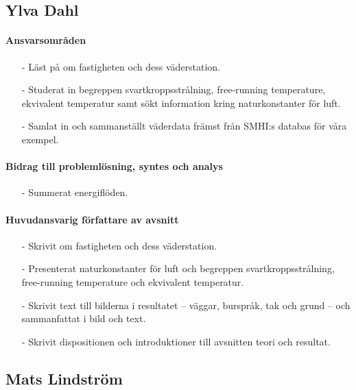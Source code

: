\documentclass[12pt,a4paper]{article}
\begin{document}
\subsection*{Ylva Dahl}

\paragraph{Ansvarsområden}

\begin{itemize}
\item[-] Läst på om fastigheten och dess väderstation.
\item[-] Studerat in begreppen svartkroppsstrålning, free-running temperature, ekvivalent temperatur samt sökt information kring naturkonstanter för luft.
\item[-] Samlat in och sammanställt väderdata främst från SMHI:s databas för våra exempel.
\end{itemize}

\paragraph{Bidrag till problemlösning, syntes och analys}
\begin{itemize}
\item[-] Summerat energiflöden.
\end{itemize}

\paragraph{Huvudansvarig författare av avsnitt}

\begin{itemize}
\item[-] Skrivit om fastigheten och dess väderstation.
\item[-] Presenterat naturkonstanter för luft och begreppen svartkroppsstrålning, free-running temperature och ekvivalent temperatur.
\item[-] Skrivit text till bilderna i resultatet – väggar, burspråk, tak och grund – och sammanfattat i bild och text.
\item[-] Skrivit dispositionen och introduktioner till avsnitten teori och resultat.
\end{itemize}


\subsection*{Mats Lindström}
\end{document}
